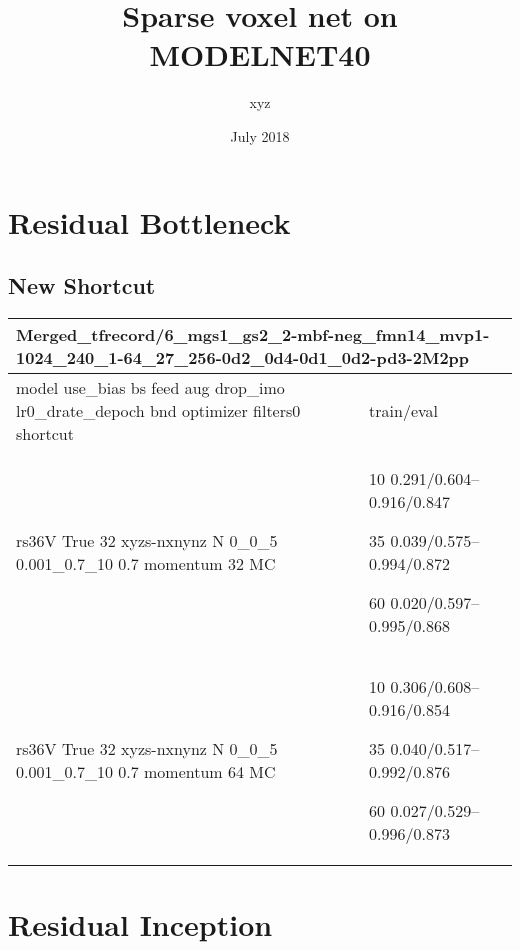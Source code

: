 \documentclass[,table,dvipsnames]{article}
\title{Sparse voxel net on MODELNET40}
\author{xyz}
\date{July 2018}
\begin{document}
\noindent
\begin{titlepage}
	\maketitle
\end{titlepage}	

\tableofcontents{}

\section{Residual Bottleneck}
\subsection{New Shortcut}
\noindent\begin{tabular}{|p{10cm}|p{5cm}| }	
	\hline
	\multicolumn{2}{|p{15cm}|}{Merged\_tfrecord/6\_mgs1\_gs2\_2-mbf-neg\_fmn14\_mvp1-1024\_240\_1-64\_27\_256-0d2\_0d4-0d1\_0d2-pd3-2M2pp}\\
	\hline
	model use\_bias bs feed aug drop\_imo lr0\_drate\_depoch bnd optimizer filters0 shortcut & train/eval \\
	
	\rowcolor{yellow!20}
	rs36V True 32 xyzs-nxnynz N 0\_0\_5 0.001\_0.7\_10 0.7 momentum 32 MC& 10 0.291/0.604--0.916/0.847\par 35 0.039/0.575--0.994/0.872\par 60 0.020/0.597--0.995/0.868\\
	
	\rowcolor{blue!20}
	rs36V True 32 xyzs-nxnynz N 0\_0\_5 0.001\_0.7\_10 0.7 momentum 64 MC& 10 0.306/0.608--0.916/0.854\par 35 0.040/0.517--0.992/0.876\par 60 0.027/0.529--0.996/0.873\\
	
	\hline 
\end{tabular}

\section{Residual Inception}
\end{document}
